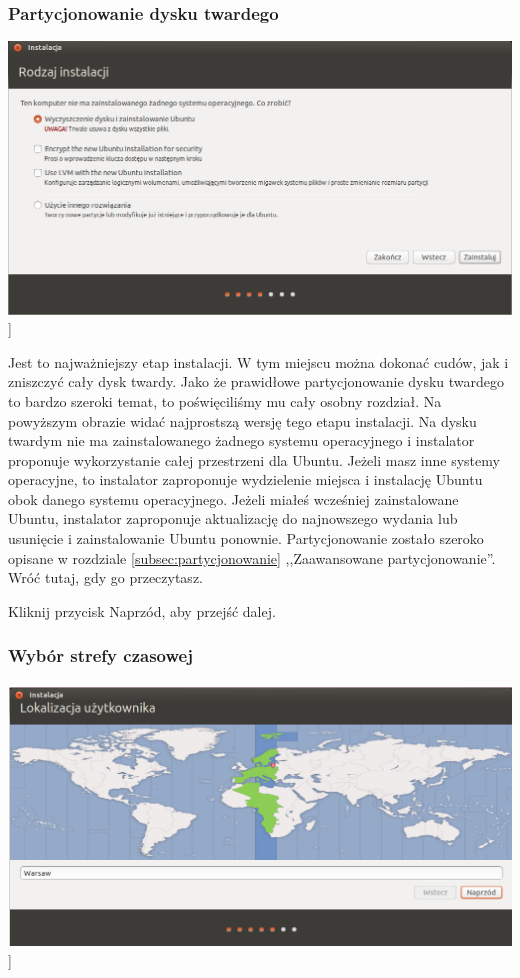 \subsubsection{Partycjonowanie dysku twardego}
\begin{center}
        \includegraphics[width=\linewidth]{images/instalator_partycjonowanie_proste.png}]
\end{center}

Jest to najważniejszy etap instalacji. W tym miejscu można dokonać cudów, jak i zniszczyć cały dysk twardy. Jako że prawidłowe partycjonowanie dysku twardego to bardzo szeroki temat, to poświęciliśmy mu cały osobny rozdział. Na powyższym obrazie widać najprostszą wersję tego etapu instalacji. Na dysku twardym nie ma zainstalowanego żadnego systemu operacyjnego i instalator proponuje wykorzystanie całej przestrzeni dla Ubuntu. Jeżeli masz inne systemy operacyjne, to instalator zaproponuje wydzielenie miejsca i instalację Ubuntu obok danego systemu operacyjnego. Jeżeli miałeś wcześniej zainstalowane Ubuntu, instalator zaproponuje aktualizację do najnowszego wydania lub usunięcie i zainstalowanie Ubuntu ponownie.
Partycjonowanie zostało szeroko opisane w rozdziale \ref{subsec:partycjonowanie} ,,Zaawansowane partycjonowanie''. Wróć tutaj, gdy go przeczytasz.
\begin{flushright}
Kliknij przycisk \textcolor{ubuntu_orange}{Naprzód}, aby przejść dalej.
\end{flushright}
\clearpage
\subsubsection{Wybór strefy czasowej}
\label{instalator_strefa_czasowa}
\begin{center}
        \includegraphics[width=\linewidth]{images/instalator_czas.png}]
\end{center}

